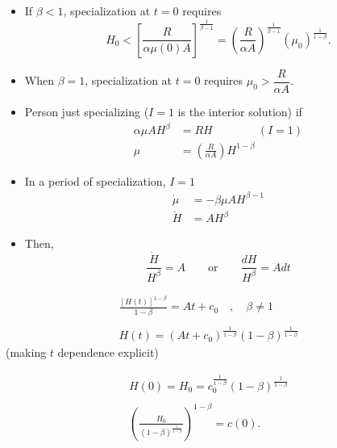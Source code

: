 \documentclass[12pt,compress,handout]{beamer}  %
\begin{document}
\begin{frame}
\begin{itemize}[<+->]
\item
If $\beta <1$, specialization at $t=0$ requires
\begin{equation*}
H_0<\left[ \frac R{\alpha \mu (0)A}\right] ^{\frac 1{\beta
-1}}=\left( \frac R{\alpha A}\right) ^{\frac 1{\beta -1}}\left( \mu
_0\right) ^{\frac 1{1-\beta }}.
\end{equation*}

\item
When $\beta =1$, specialization at $t=0$ requires $\mu_{0} >\dfrac
R{\alpha A}$.
\end{itemize}
\end{frame}


\begin{frame}
\begin{itemize}[<+->]
\item
Person just specializing ($I=1$ is the interior solution) if
\begin{align*}
\alpha \mu AH^\beta &=RH \qquad \qquad (I=1) \\
\mu &=\left( \frac R{\alpha A}\right) H^{1-\beta }
\end{align*}

\item
In a period of specialization, $I=1$
\begin{align*}
\dot{\mu} &= -\beta \mu AH^{\beta -1} \\
\dot{H} &= AH^\beta
\end{align*}

\item
Then,
\begin{equation*}
\frac{\dot{H}}{H^{\beta }} =A \qquad \text{or} \qquad
\frac{dH}{H^{\beta }} = Adt
\end{equation*}
\end{itemize}
\end{frame}


\begin{frame}
\begin{gather*}
\frac{[H(t)]^{1-\beta }}{1-\beta } =At+c_{0}\quad ,\quad \beta \neq 1 \\
\\
H(t) =(At+c_{0})^{\frac{1}{1-\beta }}(1-\beta )^{\frac{1}{1-\beta }}
\end{gather*}
(making $t$ dependence explicit)

\begin{gather*}
H(0) =H_{0}=c_{0}^{\frac{1}{1-\beta }}(1-\beta )^{\frac{1}{1-\beta }} \\
\\
\left( \frac{H_{0}}{(1-\beta )^{\frac{1}{1-\beta }}}\right)
^{1-\beta } =c(0).
\end{gather*}
\end{frame}
\end{document}
